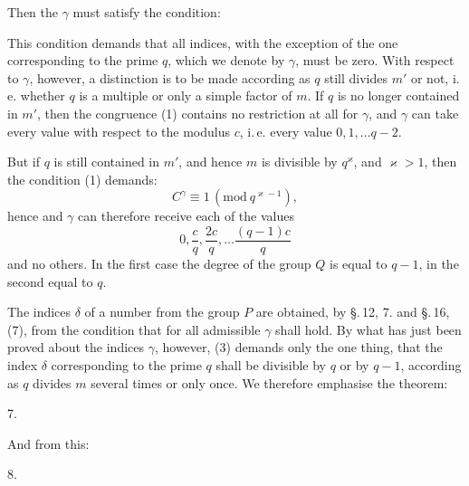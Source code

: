 
Then the $\gamma$ must satisfy the condition:


This condition demands that all indices, with the exception of the one corresponding
to the prime $q$, which we denote by $\gamma$, must be zero. With respect to
$\gamma$, however, a distinction is to be made according as $q$ still divides $m'$
or not, i.\,e. whether $q$ is a multiple or only a simple factor of $m$. If $q$ is
no longer contained in $m'$, then the congruence (1) contains no restriction at all
for $\gamma$, and $\gamma$ can take every value with respect to the modulus $c$,
i.\,e. every value $0, 1, \dots q - 2$.

But if $q$ is still contained in $m'$, and hence $m$ is divisible by $q^\varkappa$, and $\varkappa > 1$,
then the condition (1) demands:
\[
C^\gamma \equiv 1 \, (\mathrm{mod}\ q^{\varkappa-1}),
\]
hence
and $\gamma$ can therefore receive each of the values
\[
0, \dfrac{c}{q}, \dfrac{2c}{q}, \dots \dfrac{(q-1)c}{q}
\]
and no others. In the first case the degree of the group $Q$ is equal to $q - 1$, in the
second equal to $q$.

The indices $\delta$ of a number from the group $P$ are obtained, by \S.\,12, 7.
and \S.\,16, (7), from the condition that for all admissible $\gamma$
shall hold. By what has just been proved about the indices $\gamma$, however,
(3) demands only the one thing, that the index $\delta$ corresponding to the
prime $q$ shall be divisible by $q$ or by $q - 1$, according as $q$ divides $m$
several times or only once. We therefore emphasise the theorem:

7. 

And from this:

8. 
